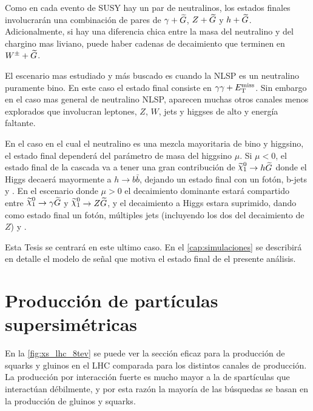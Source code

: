 Como en cada evento de SUSY hay un par de neutralinos, los estados
finales involucrarán una combinación de pares de $\gamma + \widetilde{G}$, $Z +
\widetilde{G}$ y $h + \widetilde{G}$. Adicionalmente, si hay una diferencia chica entre la masa
del neutralino y del chargino mas liviano, puede haber cadenas de decaimiento
que terminen en $W^\pm + \widetilde{G}$.

El escenario mas estudiado y más buscado es cuando la NLSP es un neutralino
puramente bino. En este caso el estado final consiste en $\gamma\gamma + E_{\mathrm{T}}^{\mathrm{miss}}$.
Sin embargo en el caso mas general de neutralino NLSP, aparecen muchas otros
canales menos explorados que involucran leptones, $Z$, $W$, jets y higgses de
alto {\pt} y energía faltante.


En el caso en el cual el neutralino es una mezcla mayoritaria de bino y higgsino, el
estado final dependerá del parámetro de masa del higgsino $\mu$. Si
$\mu <0$, el estado final de la cascada va a tener una gran contribución
de $\ninoone \to h\gravino$ donde el Higgs decaerá mayormente a $h\to b \bar{b}$,
dejando un estado final con un fotón, b-jets y {\met}. En el escenario donde
$\mu>0$ el decaimiento dominante estará compartido entre $\ninoone \to \gam\gravino$
y $\ninoone\to Z \gravino$, y el decaimiento a Higgs estara suprimido,
dando como estado final un fotón, múltiples jets (incluyendo
los dos del decaimiento de $Z$) y {\met}.

Esta Tesis se centrará en este ultimo caso. En el \cref{cap:simulaciones}
se describirá en detalle el modelo de se\~nal que motiva el estado final
de el presente análisis.




\section{Producción de partículas supersimétricas}

En la \cref{fig:xs_lhc_8tev} se puede ver la sección eficaz para la producción
de squarks y gluinos en el LHC comparada para los distintos canales de
producción. La producción por interacción fuerte es mucho mayor a la de
spartículas que interactúan débilmente, y por esta razón la mayoría de las
búsquedas se basan en la producción de gluinos y squarks.


